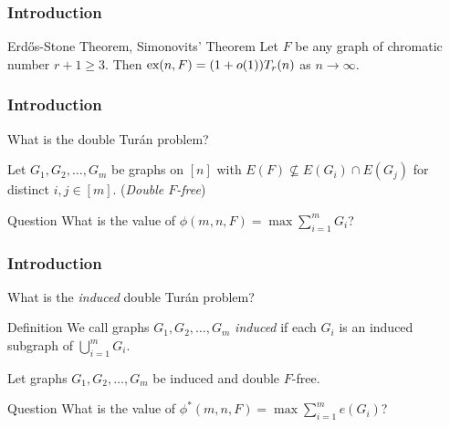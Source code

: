 \documentclass{beamer}
\newcommand*{\ex}{\textnormal{ex}}
\begin{document}
\begin{frame}
  \frametitle{Introduction}

  \begin{block}{Erd\H{o}s-Stone Theorem, Simonovits' Theorem}
    Let $F$ be any graph of chromatic number $r + 1 \geq 3$. Then $\ex(n, F) = (1 + o(1))T_r(n)$ as $n \rightarrow \infty$.
  \end{block}
\end{frame}

\begin{frame}
\frametitle{Introduction}

What is the double Turán problem? \pause

\vspace{0.5cm}

Let $G_1, G_2, \ldots, G_m$ be graphs on $[n]$ with $E(F) \not\subseteq E(G_i) \cap E(G_j)$ for distinct $i, j \in [m]$. \pause (\textit{Double $F$-free})

\pause

\begin{block}{Question}
  What is the value of $\phi(m, n, F) = \max \sum_{i = 1}^m G_i$?
\end{block}
\end{frame}

\begin{frame}
  \frametitle{Introduction}

  What is the \textit{induced} double Turán problem? \pause

  \begin{block}{Definition}
    We call graphs $G_1, G_2, \ldots, G_m$ \textit{induced} if each $G_i$ is an induced subgraph of $\bigcup_{i = 1}^m G_i$.
  \end{block}

  \pause

  \vspace{0.5cm}

  Let graphs $G_1, G_2, \ldots, G_m$ be induced and double $F$-free.

  \begin{block}{Question}
    What is the value of $\phi^*(m, n, F) = \max \sum_{i = 1}^m e(G_i)$?
  \end{block}
\end{frame}
\end{document}
